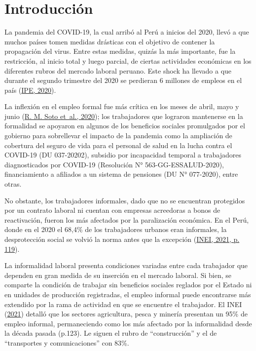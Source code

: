 \documentclass[
  letterpaper,
  12pt,
  oneside,
  spanish,
  doublespacing,
  headsepline,
  parskip]{MastersDoctoralThesis}
\begin{document}

\hypertarget{introducciuxf3n}{%
\chapter*{Introducción}\label{introducciuxf3n}}


La pandemia del COVID-19, la cual arribó al Perú a inicios del 2020,
llevó a que muchos países tomen medidas drásticas con el objetivo de
contener la propagación del virus. Entre estas medidas, quizás la más
importante, fue la restricción, al inicio total y luego parcial, de
ciertas actividades económicas en los diferentes rubros del mercado
laboral peruano. Este shock ha llevado a que durante el segundo
trimestre del 2020 se perdieran 6 millones de empleos en el país
(\protect\hyperlink{ref-ipe2020}{IPE, 2020}).

La inflexión en el empleo formal fue más crítica en los meses de abril,
mayo y junio (\protect\hyperlink{ref-soto2020}{R. M. Soto et~al.,
2020}); los trabajadores que lograron mantenerse en la formalidad se
apoyaron en algunos de los beneficios sociales promulgados por el
gobierno para sobrellevar el impacto de la pandemia como la ampliación
de cobertura del seguro de vida para el personal de salud en la lucha
contra el COVID-19 (DU 037-20202), subsidio por incapacidad temporal a
trabajadores diagnosticados por COVID-19 (Resolución N°
563-GG-ESSALUD-2020), financiamiento a afiliados a un sistema de
pensiones (DU N° 077-2020), entre otras.

No obstante, los trabajadores informales, dado que no se encuentran
protegidos por un contrato laboral ni cuentan con empresas acreedoras a
bonos de reactivación, fueron los más afectados por la paralización
económica. En el Perú, donde en el 2020 el 68,4\% de los trabajadores
urbanos eran informales, la desprotección social se volvió la norma
antes que la excepción (\protect\hyperlink{ref-inei2021}{INEI, 2021, p.
119}).

La informalidad laboral presenta condiciones variadas entre cada
trabajador que dependen en gran medida de su inserción en el mercado
laboral. Si bien, se comparte la condición de trabajar sin beneficios
sociales reglados por el Estado ni en unidades de producción
registradas, el empleo informal puede encontrarse más extendido por la
rama de actividad en que se encuentre el trabajador. El INEI
(\protect\hyperlink{ref-inei2021}{2021}) detalló que los sectores
agricultura, pesca y minería presentan un 95\% de empleo informal,
permaneciendo como los más afectado por la informalidad desde la década
pasada (p.123). Le siguen el rubro de ``construcción'' y el de
``transportes y comunicaciones'' con 83\%.
\end{document}
